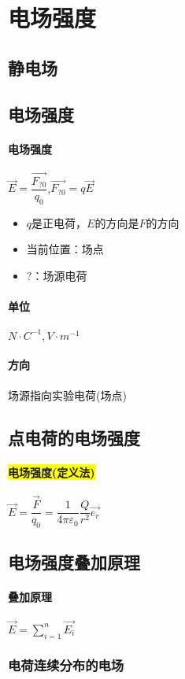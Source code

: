 \documentclass[UTF8,a4paper,12pt,scheme=chinese]{ctexbook}
\newcommand{\sll}[1]{\overrightarrow{#1}}
\newcommand{\hl}[1]{\colorbox{yellow}{#1}}
\begin{document}
	\section{电场强度}
	\subsection{静电场}
	
	\subsection{电场强度}
	\paragraph{电场强度}$ \sll{E}=\dfrac{\sll{F_{?0}}}{q_0} $,$ \sll{F_{?0}}=q\sll{E} $
	\begin{itemize}
		\item $ q $是正电荷，$ E $的方向是$ F $的方向
		\item 当前位置：场点
		\item $ ? $：场源电荷
	\end{itemize}
	\paragraph{单位}$ N\cdot C^{-1},V\cdot m^{-1} $
	\paragraph{方向}场源指向实验电荷(场点)
	\subsection{点电荷的电场强度}
	\paragraph{\hl{电场强度(定义法)}}$ \sll{E}=\dfrac{\sll{F}}{q_0}=\dfrac{1}{4\pi\varepsilon_0}\dfrac{Q}{r^2}\sll{e_r}  $
	\subsection{电场强度叠加原理}
	\paragraph{叠加原理} $ \sll{E}=\sum_{i=1}^{n}\sll{E_i} $
	\subsubsection{电荷连续分布的电场}
\end{document}
